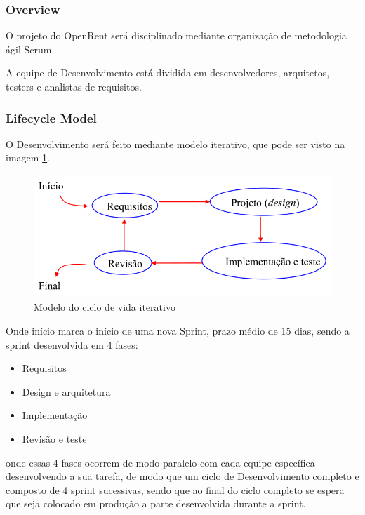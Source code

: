 \subsubsection*{Overview}

O projeto do OpenRent será disciplinado mediante organização de metodologia ágil Scrum.

A equipe de Desenvolvimento está dividida em desenvolvedores, arquitetos, testers e analistas de requisitos.


\subsubsection*{Lifecycle Model}

O Desenvolvimento será feito mediante modelo iterativo, que pode ser visto na imagem \ref{fig:life_cycle}.

\begin{figure}
    \centerline{\includegraphics[width=.5\linewidth]{images/life_cicle.png}}
    \caption[Life cycle]{Modelo do ciclo de vida iterativo}
    \label{fig:life_cycle}
\end{figure}

Onde início marca o início de uma nova Sprint, prazo médio de 15 dias, sendo a sprint desenvolvida em 4 fases:
\begin{itemize}
    \item Requisitos
    \item Design e arquitetura
    \item Implementação
    \item Revisão e teste
\end{itemize}
onde essas 4 fases ocorrem de modo paralelo com cada equipe específica desenvolvendo a sua tarefa, de modo que um ciclo de Desenvolvimento completo e composto de 4 sprint sucessivas, sendo que ao final do ciclo completo se espera que seja colocado em produção a parte desenvolvida durante a sprint.

